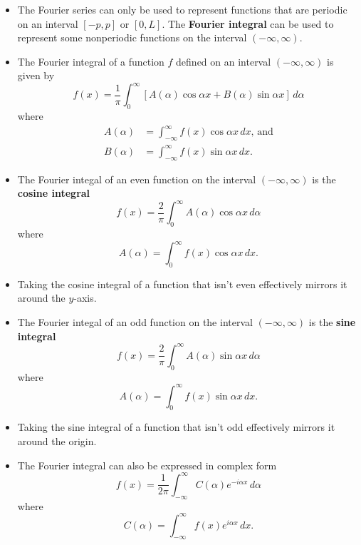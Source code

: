 \documentclass{article}
\begin{document}
\begin{itemize}
  \item The Fourier series can only be used to represent functions that are periodic on an interval $[-p, p]$ or $[0, L]$. The \textbf{Fourier integral} can be used to represent some nonperiodic functions on the interval $(-\infty, \infty)$.

  \item The Fourier integral of a function $f$ defined on an interval $(-\infty, \infty)$ is given by \[f(x) = \frac{1}{\pi} \int_0^\infty [A(\alpha) \cos \alpha x + B(\alpha) \sin \alpha x] \,d \alpha\] where \begin{align*}
          A(\alpha) & = \int_{-\infty}^\infty f(x) \cos \alpha x \,d x \text{, and} \\
          B(\alpha) & = \int_{-\infty}^\infty f(x) \sin \alpha x \,d x.
        \end{align*}

  \item The Fourier integal of an even function on the interval $(-\infty, \infty)$ is the \textbf{cosine integral} \[f(x) = \frac{2}{\pi} \int_0^\infty A(\alpha) \cos \alpha x \,d \alpha\] where \[A(\alpha) = \int_0^\infty f(x) \cos \alpha x \,d x.\]

  \item Taking the cosine integral of a function that isn't even effectively mirrors it around the $y$-axis.

  \item The Fourier integal of an odd function on the interval $(-\infty, \infty)$ is the \textbf{sine integral} \[f(x) = \frac{2}{\pi} \int_0^\infty A(\alpha) \sin \alpha x \,d \alpha\] where \[A(\alpha) = \int_0^\infty f(x) \sin \alpha x \,d x.\]

  \item Taking the sine integral of a function that isn't odd effectively mirrors it around the origin.

  \item The Fourier integral can also be expressed in complex form \[f(x) = \frac{1}{2 \pi} \int_{-\infty}^\infty C(\alpha) e^{-i \alpha x} \,d \alpha\] where \[C(\alpha) = \int_{-\infty}^\infty f(x) e^{i \alpha x} \,d x.\]
\end{itemize}
\end{document}
